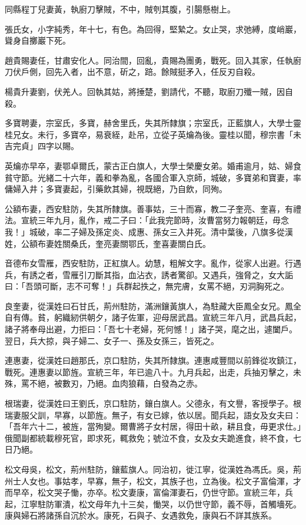 \begin{pinyinscope}
同縣程丁兒妻黃，執廚刀擊賊，不中，賊刳其腹，引腸懸樹上。

張氏女，小字純秀，年十七，有色。為回得，堅縶之。女止哭，求弛縛，度峭巖，聳身自擲巖下死。

趙貴賜妻任，甘肅安化人。同治間，回亂，貴賜為團勇，戰死。回入其家，任執廚刀伏戶側，回先入者，出不意，斫之，踣。餘賊挺矛入，任反刃自殺。

楊貴升妻劉，伏羌人。回執其姑，將捶楚，劉請代，不聽，取廚刀殲一賊，因自殺。

多寶聘妻，宗室氏，多寶，赫舍里氏，失其所隸旗；宗室氏，正藍旗人，大學士靈桂兄女。未行，多寶卒，易衰絰，赴吊，立從子英爚為後。靈桂以聞，穆宗書「未吉完貞」四字以賜。

英爚亦早卒，妻鄂卓爾氏，蒙古正白旗人，大學士榮慶女弟。婚甫逾月，姑、婦食貧守節。光緒二十六年，義和拳為亂，各國合軍入京師，城破，多寶弟和寶妻，率傭婦入井；多寶妻起，引藥飲其婦，視既絕，乃自飲，同殉。

公額布妻，西安駐防，失其所隸旗。善事姑，三十而寡，教二子奎亮、奎喜，有禮法。宣統三年九月，亂作，戒二子曰：「此我完節時，汝曹當努力報朝廷，毋念我！」城破，率二子婦及孫定炎、成惠、孫女三入井死。清中葉後，八旗多從漢姓，公額布妻姓關桑氏，奎亮妻關鄂氏，奎喜妻關白氏。

音德布女雪雁，西安駐防，正紅旗人。幼慧，粗解文字。亂作，從家人出避。行遇兵，有誘之者，雪雁引刀斷其指，血沾衣，誘者驚卻。又遇兵，強脅之，女大詬曰：「吾頭可斷，志不可奪！」兵群起抶之，無完膚，女罵不絕，刃洞胸死之。

良奎妻，從漢姓曰石甘氏，荊州駐防，滿洲鑲黃旗人，為駐藏大臣鳳全女兄。鳳全自有傳。貧，躬織紉供朝夕，諸子佐軍，迎母居武昌。宣統三年八月，武昌兵起，諸子將奉母出避，力拒曰：「吾七十老婦，死何憾！」諸子哭，麾之出，遽闔戶。翌日，兵大掠，與子婦二、女子一、孫及女孫三，皆死之。

連惠妻，從漢姓曰趙那氏，京口駐防，失其所隸旗。連惠咸豐間以前鋒從攻鎮江，戰死。連惠妻以節旌。宣統三年，年已逾八十。九月兵起，出走，兵抽刃擊之，未殊，罵不絕，被數刃，乃絕。血肉狼藉，白發為之赤。

根瑞妻，從漢姓曰王劉氏，京口駐防，鑲白旗人。父德永，有文譽，客授學子。根瑞妻服父訓，早寡，以節旌。無子，有女已嫁，依以居。聞兵起，語女及女夫曰：「吾年六十二，被旌，當殉變。爾曹將子女村居，得田十畝，耕且食，毋更求仕。」俄聞副都統載穆死官，即求死，輒救免；號泣不食，女及女夫跪進食，終不食，七日乃絕。

松文母吳，松文，荊州駐防，鑲藍旗人。同治初，徙江寧，從漢姓為馮氏。吳，荊州士人女也。事姑孝，早寡，無子，松文，其族子也，立為後。松文子富倫渾，才而早卒，松文哭子慟，亦卒。松文妻康，富倫渾妻石，仍世守節。宣統三年，兵起，江寧駐防軍潰，松文母年九十三矣，慟哭，以仍世守節，義不辱，首觸墻死。康與婦石將諸孫自沉於水。康死，石與子、女遇救免，康與石不詳其族系。


\end{pinyinscope}
